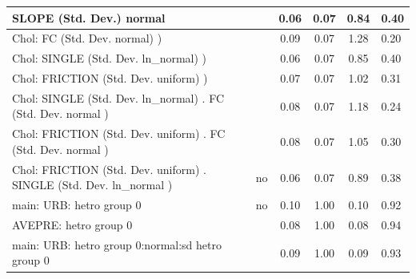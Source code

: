 \begin{table}
\begin{center}
\begin{tabular}{|l|l|c|c|c|l|}
			\hline
			SLOPE (Std. Dev.) normal &  & 0.06 & 0.07 & 0.84 & 0.40 \\
			\hline
			 Chol: FC (Std. Dev. normal) ) &  & 0.09 & 0.07 & 1.28 & 0.20 \\
			\hline
			 Chol: SINGLE (Std. Dev. ln_normal) ) &  & 0.06 & 0.07 & 0.85 & 0.40 \\
			\hline
			 Chol: FRICTION (Std. Dev. uniform) ) &  & 0.07 & 0.07 & 1.02 & 0.31 \\
			\hline
			 Chol: SINGLE (Std. Dev. ln_normal) . FC (Std. Dev.   normal ) &  & 0.08 & 0.07 & 1.18 & 0.24 \\
			\hline
			 Chol: FRICTION (Std. Dev. uniform) . FC (Std. Dev.   normal ) &  & 0.08 & 0.07 & 1.05 & 0.30 \\
			\hline
			 Chol: FRICTION (Std. Dev. uniform) . SINGLE (Std. Dev.   ln_normal ) & no & 0.06 & 0.07 & 0.89 & 0.38 \\
			\hline
			main: URB: hetro group 0 & no & 0.10 & 1.00 & 0.10 & 0.92 \\
			\hline
			AVEPRE: hetro group 0 &  & 0.08 & 1.00 & 0.08 & 0.94 \\
			\hline
			main: URB: hetro group 0:normal:sd  hetro group 0 &  & 0.09 & 1.00 & 0.09 & 0.93 \\
			\hline
		\end{tabular}
	\end{center}
\end{table}